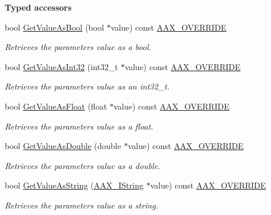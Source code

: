 \begin{Indent}\textbf{ Typed accessors}\par
\begin{DoxyCompactItemize}
\item 
bool \mbox{\hyperlink{a01533_a7b299559a4cc6de5ef4a77dae32c99e3}{Get\+Value\+As\+Bool}} (bool $\ast$value) const \mbox{\hyperlink{a00392_ac2f24a5172689ae684344abdcce55463}{A\+A\+X\+\_\+\+O\+V\+E\+R\+R\+I\+DE}}
\begin{DoxyCompactList}\small\item\em Retrieves the parameter\textquotesingle{}s value as a bool. \end{DoxyCompactList}\item 
bool \mbox{\hyperlink{a01533_a0688f74f24ea0b022b89e188c7e253da}{Get\+Value\+As\+Int32}} (int32\+\_\+t $\ast$value) const \mbox{\hyperlink{a00392_ac2f24a5172689ae684344abdcce55463}{A\+A\+X\+\_\+\+O\+V\+E\+R\+R\+I\+DE}}
\begin{DoxyCompactList}\small\item\em Retrieves the parameter\textquotesingle{}s value as an int32\+\_\+t. \end{DoxyCompactList}\item 
bool \mbox{\hyperlink{a01533_ac3301a3dc20e65906caa5610897a2a1a}{Get\+Value\+As\+Float}} (float $\ast$value) const \mbox{\hyperlink{a00392_ac2f24a5172689ae684344abdcce55463}{A\+A\+X\+\_\+\+O\+V\+E\+R\+R\+I\+DE}}
\begin{DoxyCompactList}\small\item\em Retrieves the parameter\textquotesingle{}s value as a float. \end{DoxyCompactList}\item 
bool \mbox{\hyperlink{a01533_a21e7a9e774cf81aa055d99cfb7f2a222}{Get\+Value\+As\+Double}} (double $\ast$value) const \mbox{\hyperlink{a00392_ac2f24a5172689ae684344abdcce55463}{A\+A\+X\+\_\+\+O\+V\+E\+R\+R\+I\+DE}}
\begin{DoxyCompactList}\small\item\em Retrieves the parameter\textquotesingle{}s value as a double. \end{DoxyCompactList}\item 
bool \mbox{\hyperlink{a01533_a35153159e40183807eae373c21b38bcc}{Get\+Value\+As\+String}} (\mbox{\hyperlink{a01873}{A\+A\+X\+\_\+\+I\+String}} $\ast$value) const \mbox{\hyperlink{a00392_ac2f24a5172689ae684344abdcce55463}{A\+A\+X\+\_\+\+O\+V\+E\+R\+R\+I\+DE}}
\begin{DoxyCompactList}\small\item\em Retrieves the parameter\textquotesingle{}s value as a string. \end{DoxyCompactList}\end{DoxyCompactItemize}
\end{Indent}



